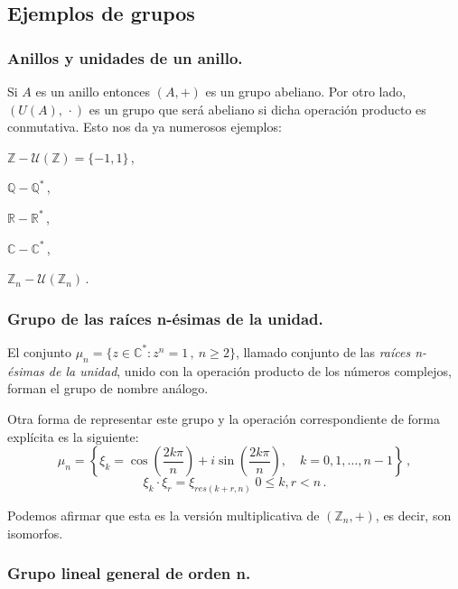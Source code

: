 \subsection{Ejemplos de grupos}

\subsubsection{Anillos y unidades de un anillo.}

Si $A$ es un anillo entonces $(A,+)$ es un grupo abeliano. Por otro lado, $(U(A),\,\cdot)$ es un grupo que será abeliano si dicha operación producto es conmutativa. Esto nos da ya numerosos ejemplos:

\begin{itemize*}[label=,itemjoin=\hspace{2em},before=\hspace{\zadlen}]
  \item $\mathbb{Z}-\mathcal U\left(\mathbb{Z}\right)=\{-1,1\}$\,,
  \item $\mathbb{Q}-\mathbb{Q}^{*}$\,,
  \item $\mathbb{R}-\mathbb{R}^{*}$\,,
  \item $\mathbb{C}-\mathbb{C}^{*}$\,,
  \item $\mathbb{Z}_n-\mathcal U\left(\mathbb{Z}_n\right)$\,.
\end{itemize*}

\subsubsection{Grupo de las raíces n-ésimas de la unidad.}

El conjunto $\mu_n = \{z \in \mathbb{C}^{*} : z^n = 1\,,\ n \geq 2\}$, llamado conjunto de las \textit{raíces n-ésimas de la unidad}, unido con la operación producto de los números complejos, forman el grupo de nombre análogo.

Otra forma de representar este grupo y la operación correspondiente de forma explícita es la siguiente:
$$\mu_n = \left\{\xi_k = \cos\left(\frac{2k\pi}{n}\right)+i\sin\left(\frac{2k\pi}{n}\right),\quad k=0,1,\dots ,n-1\right\}\,,$$
$$\xi_k \cdot \xi_r = \xi_{res(k+r,n)} \; 0 \le k,r < n\,.$$

Podemos afirmar que esta es la versión multiplicativa de $(\mathbb{Z}_n,+)$, es decir, son isomorfos.

\subsubsection{Grupo lineal general de orden n.}

